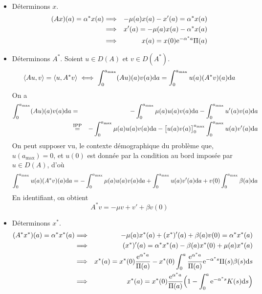\begin{itemize}
    \item Déterminons $x$. 
    \begin{eqnarray*}
        (Ax)(a) = \alpha^*x(a) &\Longrightarrow& -\mu(a)x(a)-x'(a) = \alpha^*x(a) \\
        &\Longrightarrow& x'(a) = -\mu(a)x(a)-\alpha^*x(a) \\
        &\Longrightarrow& x(a) = x(0)\mathrm{e}^{-\alpha^*a}\Pi(a)
    \end{eqnarray*}
    \item Déterminons $A^*$. Soient $u \in D(A)$ et $v \in D(A^*)$.
    \begin{eqnarray*}
        \langle Au, v\rangle = \langle u,A^*v\rangle \iff \int_0^{a_{\max}} (Au)(a)v(a)\mathrm{d} a = \int_0^{a_{\max}} u(a)(A^*v)(a)\mathrm{d} a
    \end{eqnarray*}
    On a 
    \begin{eqnarray*}
        \int_0^{a_{\max}} (Au)(a)v(a)\mathrm{d} a &=& -\int_0^{a_{\max}} \mu(a)u(a)v(a)\mathrm{d} a- \int_0^{a_{\max}} u'(a)v(a)\mathrm{d} a \\
        &\overset{\text{IPP}}{=}& -\int_0^{a_{\max}} \mu(a)u(a)v(a)\mathrm{d} a-\big[u(a)v(a)\big]_0^{a_{\max}} \int_0^{a_{\max}} u(a)v'(a)\mathrm{d} a 
    \end{eqnarray*}
    On peut supposer vu, le contexte démographique du problème que, $u(a_{\max})=0$, et $u(0)$ est donnée par la condition au bord imposée par $u \in D(A)$, d'où 
    \begin{equation*}
        \int_0^{a_{\max}} u(a)(A^*v)(a)\mathrm{d} a = -\int_0^{a_{\max}} \mu(a)u(a)v(a)\mathrm{d} a + \int_0^{a_{\max}}u(a)v'(a)\mathrm{d} a + v(0)\int_0^{a_{\max}}\beta(a)\mathrm{d} a
    \end{equation*}
    En identifiant, on obtient 
    \begin{equation*}
        A^*v = -\mu v + v' + \beta v(0)
    \end{equation*}
    \item Déterminons $x^*$.
    \begin{eqnarray*}
        (A^*x^*)(a) = \alpha^*x^*(a) &\Longrightarrow& -\mu(a)x^*(a)+(x^*)'(a)+\beta(a)v(0)=\alpha^*x^*(a) \\
        &\Longrightarrow& (x^*)'(a) = \alpha^*x^*(a) - \beta(a)x^*(0)+\mu(a)x^*(a) \\
        &\Longrightarrow& x^*(a) = x^*(0)\frac{\mathrm{e}^{\alpha^*a}}{\Pi(a)} - x^*(0)\int_0^a\frac{\mathrm{e}^{\alpha^*a}}{\Pi(a)}\mathrm{e}^{-\alpha^* s}\Pi(s)\beta(s)\mathrm{d} s \\
        &\Longrightarrow& x^*(a) = x^*(0)\frac{\mathrm{e}^{\alpha^*a}}{\Pi(a)}\Big(1-\int_0^a\mathrm{e}^{-\alpha^*s}K(s)\mathrm{d} s\Big)
    \end{eqnarray*}
\end{itemize}
